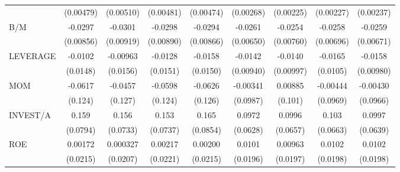 \begin{table}[htbp]
\begin{tabular}{l*{8}{c}}
                    &   (0.00479)         &   (0.00510)         &   (0.00481)         &   (0.00474)         &   (0.00268)         &   (0.00225)         &   (0.00227)         &   (0.00237)         \\
B/M                 &     -0.0297\sym{***}&     -0.0301\sym{***}&     -0.0298\sym{***}&     -0.0294\sym{***}&     -0.0261\sym{***}&     -0.0254\sym{***}&     -0.0258\sym{***}&     -0.0259\sym{***}\\
                    &   (0.00856)         &   (0.00919)         &   (0.00890)         &   (0.00866)         &   (0.00650)         &   (0.00760)         &   (0.00696)         &   (0.00671)         \\
LEVERAGE            &     -0.0102         &    -0.00963         &     -0.0128         &     -0.0158         &     -0.0142         &     -0.0140         &     -0.0165         &     -0.0158         \\
                    &    (0.0148)         &    (0.0156)         &    (0.0151)         &    (0.0150)         &   (0.00940)         &   (0.00997)         &    (0.0105)         &   (0.00980)         \\
MOM                 &     -0.0617         &     -0.0457         &     -0.0598         &     -0.0626         &    -0.00341         &     0.00885         &    -0.00444         &    -0.00430         \\
                    &     (0.124)         &     (0.127)         &     (0.124)         &     (0.126)         &    (0.0987)         &     (0.101)         &    (0.0969)         &    (0.0966)         \\
INVEST/A            &       0.159\sym{*}  &       0.156\sym{*}  &       0.153\sym{*}  &       0.165\sym{*}  &      0.0972         &      0.0996         &       0.103         &      0.0997         \\
                    &    (0.0794)         &    (0.0733)         &    (0.0737)         &    (0.0854)         &    (0.0628)         &    (0.0657)         &    (0.0663)         &    (0.0639)         \\
ROE                 &     0.00172         &    0.000327         &     0.00217         &     0.00200         &      0.0101         &     0.00963         &      0.0102         &      0.0102         \\
                    &    (0.0215)         &    (0.0207)         &    (0.0221)         &    (0.0215)         &    (0.0196)         &    (0.0197)         &    (0.0198)         &    (0.0198)         \\

\end{tabular}
\end{table}
